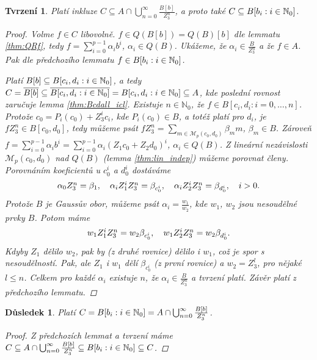 \documentclass[11pt,a4paper]{article}
\newcommand\m[1]{\mathbb { #1 }} %
\newcommand\p[1]{\mathcal{ #1 }} %
\newcommand\N{\m N}
\newcommand*{\ml}[1]{\[\textstyle\let\displaystyle\textstyle#1\]}	%
\let \icl \overline %
\newcounter{numb}
\theoremstyle{definition}
\theoremstyle{plain}
\newtheorem{tvrzeni}[numb]{Tvrzení}
\newtheorem{dusledek}[numb]{Důsledek}
\begin{document}
\newpage %
\begin{tvrzeni}
	Platí inkluze $C \subseteq A \cap \bigcup_{n = 0}^\infty \frac{B[b]}{Z_3^n}$, a proto také $C \subseteq \Ball$.

	\begin{proof}
		\newcommand*{\I}{_{i = 0}^{p - 1}}
		
		Volme $f \in C$ libovolně. $f \in Q(B[b]) = Q(B)[b]$ dle lemmatu \ref{thm:QRf}, tedy $f = \sum\I \alpha_i b^i$, $\alpha_i \in Q(B)$. Ukážeme, že $\alpha_i \in \frac{B}{Z_3^n}$ a že $f \in A$. Pak dle předchozího lemmatu $f \in \Ball$.
		
		Platí $B[b] \subseteq \Bcdall$, a tedy $C = \icl{B[b]} \subseteq \icl{\Bcdall} = \Bcdall \subseteq A$, kde poslední rovnost zaručuje lemma \ref{thm:Bcdall_icl}. Existuje $n \in \N_0$, že $f \in B[c_i, d_i: i = 0, \hdots, n]$. Protože $c_0 = P_i(c_0) + Z_3^i c_i$, kde $P_i(c_0) \in B$, a totéž platí pro $d_i$, je $f Z_3^n \in B[c_0, d_0]$, tedy můžeme psát $f Z_3^n = \sum_{m \in \p M_p(c_0, d_0)} \beta_m m$, $\beta_m \in B$. Zároveň $f = \sum\I \alpha_i b^i = \sum\I \alpha_i (Z_1 c_0 + Z_2 d_0)^i$, $\alpha_i \in Q(B)$. Z lineární nezávislosti $\p M_p(c_0, d_0)$ nad $Q(B)$ (lemma \ref{thm:lin_indep}) můžeme porovnat členy. Porovnáním koeficientů u $c_0^i$ a $d_0^i$ dostáváme
		\ml{
			\alpha_0 Z_3^n = \beta_1, \quad \alpha_i Z_1^i Z_3^n = \beta_{c_0^i}, \quad \alpha_i Z_2^i Z_3^n = \beta_{d_0^i}, \quad i > 0.
		}
		Protože $B$ je Gaussův obor, můžeme psát $\alpha_i = \frac{w_1}{w_2}$, kde $w_1$, $w_2$ jsou nesoudělné prvky $B$. Potom máme
		\ml{
			w_1 Z_1^i Z_3^n = w_2 \beta_{c_0^i}, \quad w_1 Z_2^i Z_3^n = w_2 \beta_{d_0^i}.
		}
		Kdyby $Z_1$ dělilo $w_2$, pak by (z druhé rovnice) dělilo i $w_1$, což je spor s nesoudělností. Pak, ale $Z_1$ i $w_1$ dělí $\beta_{c_0^i}$ (z první rovnice) a $w_2 = Z_3^l$, pro nějaké $l \leq n$. Celkem pro každé $\alpha_i$ existuje $n$, že $\alpha_i \in \frac{B}{Z_3^n}$ a tvrzení platí. Závěr platí z předchozího lemmatu.
	\end{proof}
\end{tvrzeni}

\begin{dusledek}
	Platí $C = \Ball = A \cap \bigcup_{n = 0}^\infty \frac{B[b]}{Z_3^n}$.
	
	\begin{proof}
		Z předchozích lemmat a tvrzení máme $C \subseteq A \cap \bigcup_{n = 0}^\infty \frac{B[b]}{Z_3^n} \subseteq \Ball \subseteq C$.
	\end{proof}
\end{dusledek}
\end{document}
